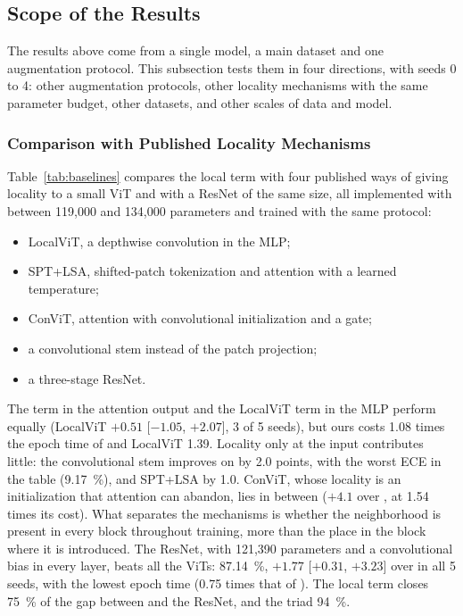 

\subsection{Scope of the Results}
\label{sec:res-alcance}
The results above come from a single model, a main dataset and one augmentation protocol. This subsection tests them in four directions, with seeds 0 to 4: other augmentation protocols, other locality mechanisms with the same parameter budget, other datasets, and other scales of data and model.

\subsubsection{Comparison with Published Locality Mechanisms}
\label{sec:res-baselines}
Table~\ref{tab:baselines} compares the local term with four published ways of giving locality to a small ViT and with a ResNet of the same size, all implemented with between 119,000 and 134,000 parameters and trained with the same protocol:
\begin{itemize}
  \item LocalViT, a depthwise convolution in the MLP;
  \item SPT+LSA, shifted-patch tokenization and attention with a learned temperature;
  \item ConViT, attention with convolutional initialization and a gate;
  \item a convolutional stem instead of the patch projection;
  \item a three-stage ResNet.
\end{itemize}
The term in the attention output and the LocalViT term in the MLP perform equally (LocalViT $+0.51$ [$-1.05$, $+2.07$], 3 of 5 seeds), but ours costs 1.08 times the epoch time of  and LocalViT 1.39. Locality only at the input contributes little: the convolutional stem improves on  by 2.0 points, with the worst ECE in the table (9.17~\%), and SPT+LSA by 1.0. ConViT, whose locality is an initialization that attention can abandon, lies in between ($+4.1$ over , at 1.54 times its cost). What separates the mechanisms is whether the neighborhood is present in every block throughout training, more than the place in the block where it is introduced. The ResNet, with 121,390 parameters and a convolutional bias in every layer, beats all the ViTs: 87.14~\%, $+1.77$ [$+0.31$, $+3.23$] over  in all 5 seeds, with the lowest epoch time (0.75 times that of ). The local term closes 75~\% of the gap between  and the ResNet, and the triad 94~\%.

